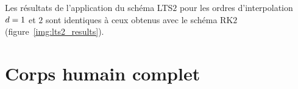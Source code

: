%		
%		
%		
%		


Les résultats de l'application du schéma LTS$2$ pour les
ordres d'interpolation $d=1$ et $2$
sont identiques à ceux obtenus avec le schéma RK$2$ (figure~\ref{img:lts2_results}).
\\




\section{Corps humain complet}
\label{ssect:corps_complet}

